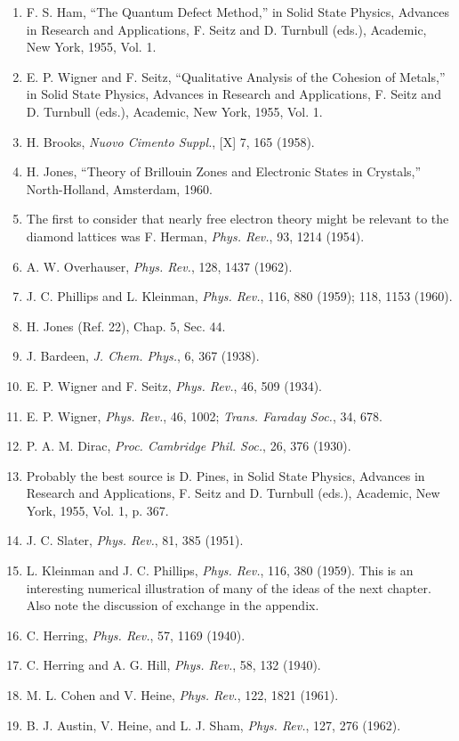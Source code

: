 \begin{enumerate}[label=(\arabic*),leftmargin=2.8em,itemsep=1pt,parsep=0pt]
\item F. S. Ham, ``The Quantum Defect Method,'' in Solid State Physics, Advances in Research and Applications, F. Seitz and D. Turnbull (eds.), Academic, New York, 1955, Vol. 1.
\item E. P. Wigner and F. Seitz, ``Qualitative Analysis of the Cohesion of Metals,'' in Solid State Physics, Advances in Research and Applications, F. Seitz and D. Turnbull (eds.), Academic, New York, 1955, Vol. 1.
\item H. Brooks, \emph{Nuovo Cimento Suppl.}, [X] 7, 165 (1958).
\item H. Jones, ``Theory of Brillouin Zones and Electronic States in Crystals,'' North-Holland, Amsterdam, 1960.
\item The first to consider that nearly free electron theory might be relevant to the diamond lattices was F. Herman, \emph{Phys. Rev.}, 93, 1214 (1954).
\item A. W. Overhauser, \emph{Phys. Rev.}, 128, 1437 (1962).
\item J. C. Phillips and L. Kleinman, \emph{Phys. Rev.}, 116, 880 (1959); 118, 1153 (1960).
\item H. Jones (Ref. 22), Chap. 5, Sec. 44.
\item J. Bardeen, \emph{J. Chem. Phys.}, 6, 367 (1938).
\item E. P. Wigner and F. Seitz, \emph{Phys. Rev.}, 46, 509 (1934).
\item E. P. Wigner, \emph{Phys. Rev.}, 46, 1002; \emph{Trans. Faraday Soc.}, 34, 678.
\item P. A. M. Dirac, \emph{Proc. Cambridge Phil. Soc.}, 26, 376 (1930).
\item Probably the best source is D. Pines, in Solid State Physics, Advances in Research and Applications, F. Seitz and D. Turnbull (eds.), Academic, New York, 1955, Vol. 1, p. 367.
\item J. C. Slater, \emph{Phys. Rev.}, 81, 385 (1951).
\item L. Kleinman and J. C. Phillips, \emph{Phys. Rev.}, 116, 380 (1959). This is an interesting numerical illustration of many of the ideas of the next chapter. Also note the discussion of exchange in the appendix.
\item C. Herring, \emph{Phys. Rev.}, 57, 1169 (1940).
\item C. Herring and A. G. Hill, \emph{Phys. Rev.}, 58, 132 (1940).
\item M. L. Cohen and V. Heine, \emph{Phys. Rev.}, 122, 1821 (1961).
\item B. J. Austin, V. Heine, and L. J. Sham, \emph{Phys. Rev.}, 127, 276 (1962).

\end{enumerate}

